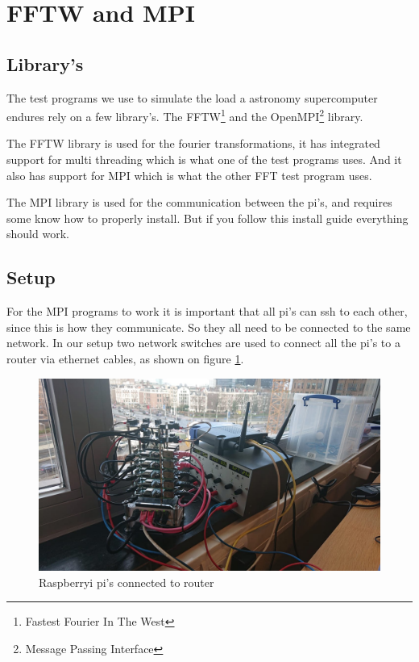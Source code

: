 

\section{FFTW and MPI}

\subsection{Library's}
The test programs we use to simulate the load a astronomy supercomputer endures rely on a few library's. The FFTW\footnote{Fastest Fourier In The West} and the OpenMPI\footnote{Message Passing Interface} library. \par The FFTW library is used for the fourier transformations, it has integrated support for multi threading which is what one of the test programs uses. And it also has support for MPI which is what the other FFT test program uses. \par The MPI library is used for the communication between the pi's, and requires some know how to properly install. But if you follow this install guide everything should work. 

\subsection{Setup}
For the MPI programs to work it is important that all pi's can ssh to each other, since this is how they communicate. So they all need to be connected to the same network. In our setup two network switches are used to connect all the pi's to a router via ethernet cables, as shown on figure \ref{fig: Pi's with router}.
\begin{figure}[h!]
    \centering
    \includegraphics[width=\linewidth]{images/Pi_with_router.jpeg}
    \caption{Raspberryi pi's connected to router}
    \label{fig: Pi's with router}
\end{figure}

